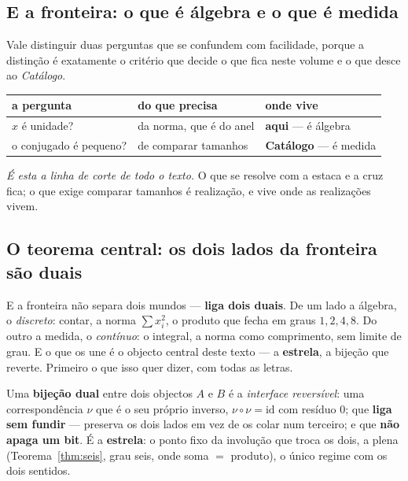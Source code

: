 \documentclass[livro.tex]{subfiles}
\begin{document}
\subsection{E a fronteira: o que é álgebra e o que é medida}\label{sec:fronteira-alg}

\noindent Vale distinguir duas perguntas que se confundem com facilidade, porque a distinção é
exatamente o critério que decide o que fica neste volume e o que desce ao \emph{Catálogo}.

\begin{center}\small
\begin{tabular}{@{}lll@{}}
\toprule
\textbf{a pergunta} & \textbf{do que precisa} & \textbf{onde vive} \\
\midrule
$x$ é unidade? & da norma, que é do anel & \textbf{aqui} --- é álgebra \\
o conjugado é pequeno? & de comparar tamanhos & \textbf{Catálogo} --- é medida \\
\bottomrule
\end{tabular}
\end{center}


\noindent \emph{É esta a linha de corte de todo o texto.} O que se resolve com a estaca e a cruz
fica; o que exige comparar tamanhos é realização, e vive onde as realizações vivem.

\subsection{O teorema central: os dois lados da fronteira são duais}\label{sec:central}

\noindent E a fronteira não separa dois mundos --- \textbf{liga dois duais}. De um lado a álgebra, o
\emph{discreto}: contar, a norma $\sum x_i^2$, o produto que fecha em graus $1,2,4,8$. Do outro a
medida, o \emph{contínuo}: o integral, a norma como comprimento, sem limite de grau. E o que os une é
o objecto central deste texto --- a \textbf{estrela}, a bijeção que reverte. Primeiro o que isso quer
dizer, com todas as letras.

\begin{definicao}\label{def:bijdual}
Uma \textbf{bijeção dual} entre dois objectos $A$ e $B$ é a \emph{interface reversível}: uma
correspondência $\nu$ que é o seu próprio inverso, $\nu\circ\nu=\mathrm{id}$ com resíduo $0$; que
\textbf{liga sem fundir} --- preserva os dois lados em vez de os colar num terceiro; e que \textbf{não
apaga um bit}. É a \textbf{estrela}: o ponto fixo da involução que troca os dois, a plena
(Teorema~\ref{thm:seis}, grau seis, onde soma $=$ produto), o único regime com os dois sentidos.
\end{definicao}
\end{document}
